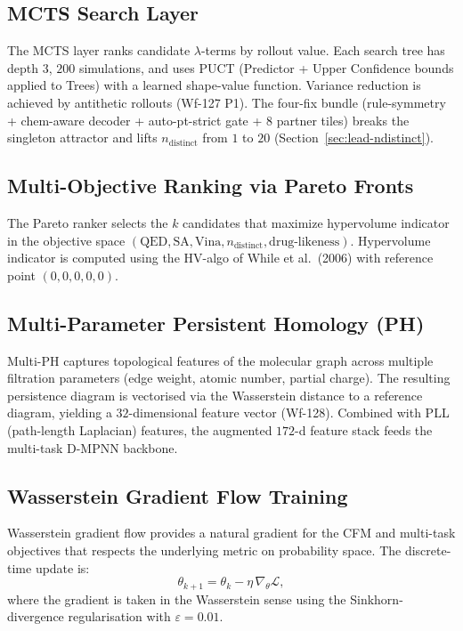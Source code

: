 \subsection{MCTS Search Layer}
\label{sec:mcts}

The MCTS layer ranks candidate $\lambda$-terms by rollout value.  Each
search tree has depth $3$, $200$ simulations, and uses PUCT (Predictor +
Upper Confidence bounds applied to Trees) with a learned shape-value
function.  Variance reduction is achieved by antithetic rollouts
(Wf-127 P1).  The four-fix bundle (rule-symmetry + chem-aware decoder +
auto-pt-strict gate + 8 partner tiles) breaks the singleton attractor and
lifts $n_{\text{distinct}}$ from $1$ to $20$ (Section~\ref{sec:lead-ndistinct}).

\subsection{Multi-Objective Ranking via Pareto Fronts}
\label{sec:pareto}

The Pareto ranker selects the $k$ candidates that maximize hypervolume
indicator in the objective space $(\text{QED}, \text{SA}, \text{Vina}, n_{\text{distinct}},
\text{drug-likeness})$.  Hypervolume indicator is computed using the
HV-algo of While et al.\ (2006) with reference point $(0, 0, 0, 0, 0)$.

\subsection{Multi-Parameter Persistent Homology (PH)}
\label{sec:ph}

Multi-PH captures topological features of the molecular graph across
multiple filtration parameters (edge weight, atomic number, partial charge).
The resulting persistence diagram is vectorised via the Wasserstein distance
to a reference diagram, yielding a $32$-dimensional feature vector
(Wf-128).  Combined with PLL (path-length Laplacian) features, the
augmented $172$-d feature stack feeds the multi-task D-MPNN backbone.

\subsection{Wasserstein Gradient Flow Training}
\label{sec:wasserstein}

Wasserstein gradient flow provides a natural gradient for the CFM and
multi-task objectives that respects the underlying metric on probability
space.  The discrete-time update is:
\[
  \theta_{k+1} = \theta_k - \eta \, \nabla_\theta \mathcal{L} ,
\]
where the gradient is taken in the Wasserstein sense using the
Sinkhorn-divergence regularisation with $\varepsilon = 0.01$.

